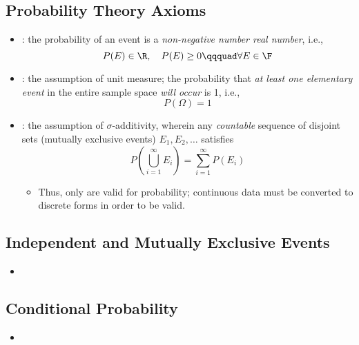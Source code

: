 \begin{itemize}
  \subsection{Probability Theory Axioms}
  \begin{itemize}
    \item {}: the probability of an event is a \emph{non-negative number real number}, i.e.,
    \[%
    P(E) \in \R,\quad P(E)\geq 0 \qqquad \forall E \in \F
    \]%
    \item {}: the assumption of unit measure; the probability that \emph{at least one elementary event} in the entire sample space \emph{will occur} is 1, i.e.,
    \[%
    P(\Omega) = 1
    \]%
    \item {}: the assumption of \(\sigma \)-additivity, wherein any \emph{countable} sequence of disjoint sets (mutually exclusive events) \(E_1,E_2,\ldots\) satisfies
    \[%
    P\left(\bigcup_{i=1}^{\infty}E_i\right) = \sum_{i = 1}^{\infty}P(E_i)
    \]%
    \begin{itemize}
      \item Thus, only \hyperref[Subsection: Data Types]{} are valid for probability; continuous data must be converted to discrete forms in order to be valid.
    \end{itemize}
  \end{itemize}

  \subsection{Independent and Mutually Exclusive Events}
  \begin{itemize}
    \item 
  \end{itemize}
  
  \subsection{Conditional Probability}
  \begin{itemize}
    \item 
  \end{itemize}
  
\end{itemize}

